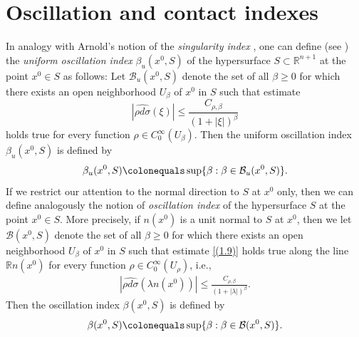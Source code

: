 \documentclass[a4paper, 11pt]{article}
\theoremstyle{plain}
\theoremstyle{definition}
\theoremstyle{lemma}
\theoremstyle{Remark}
\theoremstyle{proposition}
\theoremstyle{corollary}
\theoremstyle{example}
\theoremstyle{assumption}
\begin{document}
\section{Oscillation and contact indexes}


In analogy with
Arnold's notion of the \emph{singularity index} \cite{Ar, agvMN82}, one can define (see \cite{I.K.M}) the \emph{uniform oscillation
index} $\beta_u(x^0, S)$ of the hypersurface $S\subset \mathbb{R}^{n+1}$ at the point $x^0\in S$ as follows: Let $\mathcal{B}_u(x^0, S)$ denote the set of all $\beta\ge0$ for which there exists an open neighborhood
$U_\beta$ of $x^0$ in $S$ such that estimate
\begin{equation}\label{(1.9)}
|\widehat{\rho d\sigma}(\xi)|\le \frac{C_{\rho, \beta}}{(1+|\xi|)^\beta}
\end{equation}
holds true for every function $\rho\in C_0^\infty (U_\beta)$. Then the uniform oscillation
index $\beta_u(x^0, S)$ is defined by
\begin{eqnarray*}
\beta_u(x^0, S)\colonequals \sup\{\beta: \beta\in  \mathcal{B}_u(x^0, S)\}.
\end{eqnarray*}
If we restrict our attention to the normal direction to $S$ at $x^0$ only, then we can define
analogously the notion of \emph{oscillation index} of the hypersurface $S$ at the point $x^0\in S$.
More precisely, if $n(x^0)$ is a unit normal to $S$ at $x^0$, then we let $\mathcal{B}(x^0, S)$ denote the set of all $\beta\ge0$ for which there exists an open neighborhood
$U_\beta$ of $x^0$ in $S$ such that estimate \eqref{(1.9)} holds true along the line $\mathbb{R}n(x^0)$ for every function $\rho\in C_0^\infty(U_\rho)$, i.e.,
\begin{eqnarray*}
|\widehat{\rho d\sigma}(\lambda n(x^0))|\le \frac{C_{\rho, \beta}}{(1+|\lambda|)^\beta}.
\end{eqnarray*}
Then the oscillation index $\beta(x^0, S)$ is defined by
\begin{eqnarray*}
\beta(x^0, S)\colonequals \sup\{\beta: \beta\in  \mathcal{B}(x^0, S)\}.
\end{eqnarray*}
\end{document}
